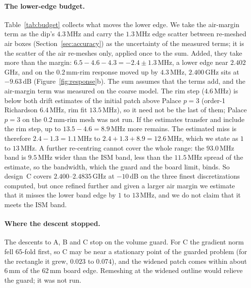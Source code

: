 \documentclass{anvil-paper}
\begin{document}
\paragraph{The lower-edge budget.}
Table~\ref{tab:budget} collects what moves the lower edge. We take the
air-margin term as the dip's $4.3$\,MHz and carry the $1.3$\,MHz edge scatter
between re-meshed air boxes (Section~\ref{sec:accuracy}) as the uncertainty
of the measured terms; it is the scatter of the air re-meshes only, applied
once to the sum. Added, they take more than the margin:
$6.5 - 4.6 - 4.3 = -2.4 \pm 1.3$\,MHz, a lower edge near $2.402$\,GHz, and on
the $0.2$\,mm-rim response moved up by $4.3$\,MHz, $2.400$\,GHz sits at
$-9.63$\,dB (Figure~\ref{fig:response}b). The sum assumes that the terms add,
and the air-margin term was measured on the coarse model. The rim step
($4.6$\,MHz) is below both drift estimates of the initial patch above Palace
$p = 3$ (order-1 Richardson $6.4$\,MHz, rim fit $13.5$\,MHz), so it need not be
the last of them; Palace $p = 3$ on the $0.2$\,mm-rim mesh was not run. If the
estimates transfer and include the rim step, up to $13.5 - 4.6 = 8.9$\,MHz
more remains. The estimated miss is therefore $2.4 - 1.3 = 1.1$\,MHz to
$2.4 + 1.3 + 8.9 = 12.6$\,MHz, which we state as $1$ to $13$\,MHz. A further
re-centring cannot cover the whole range: the $93.0$\,MHz band is $9.5$\,MHz
wider than the ISM band, less than the $11.5$\,MHz spread of the estimate, so
the bandwidth, which the guard and the board limit, binds. So design~C
covers $2.400$--$2.4835$\,GHz at $-10$\,dB on the three finest discretizations
computed, but once refined further and given a larger air margin we estimate
that it misses the lower band edge by $1$ to $13$\,MHz, and we do not claim
that it meets the ISM band.

\paragraph{Where the descent stopped.}
The descents to A, B and C stop on the volume guard. For C the gradient norm fell 65-fold first, so C may be
near a stationary point of the guarded problem (for the rectangle it grew,
$0.023$ to $0.074$), and the widened patch comes within about $6$\,mm of
the $62$\,mm board edge. Remeshing at the widened outline would relieve the
guard; it was not run.
\end{document}

